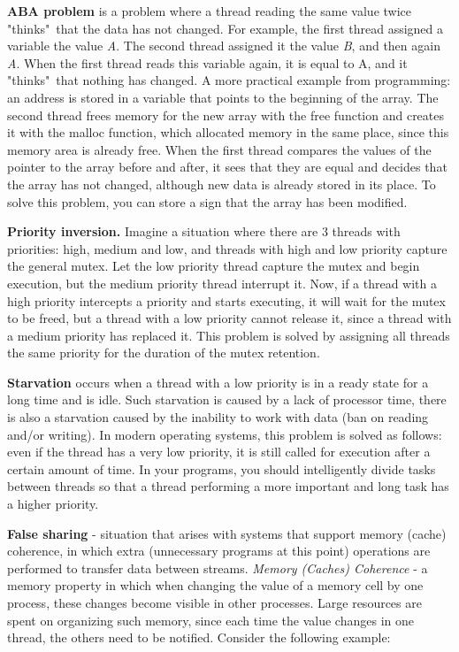 {	\par\textbf{ABA problem} is a problem where a thread reading the same value twice "thinks"\ that the data has not changed. For example, the first thread assigned a variable the value \textit{A}. The second thread assigned it the value \textit{B}, and then again \textit{A}. When the first thread reads this variable again, it is equal to A, and it "thinks"\ that nothing has changed. A more practical example from programming: an address is stored in a variable that points to the beginning of the array. The second thread frees memory for the new array with the free function and creates it with the malloc function, which allocated memory in the same place, since this memory area is already free. When the first thread compares the values of the pointer to the array before and after, it sees that they are equal and decides that the array has not changed, although new data is already stored in its place. To solve this problem, you can store a sign that the array has been modified.
	\par\textbf{Priority inversion.} Imagine a situation where there are 3 threads with priorities: high, medium and low, and threads with high and low priority capture the general mutex. Let the low priority thread capture the mutex and begin execution, but the medium priority thread interrupt it. Now, if a thread with a high priority intercepts a priority and starts executing, it will wait for the mutex to be freed, but a thread with a low priority cannot release it, since a thread with a medium priority has replaced it. This problem is solved by assigning all threads the same priority for the duration of the mutex retention.
	\par\textbf{Starvation} occurs when a thread with a low priority is in a ready state for a long time and is idle. Such starvation is caused by a lack of processor time, there is also a starvation caused by the inability to work with data (ban on reading and/or writing). In modern operating systems, this problem is solved as follows: even if the thread has a very low priority, it is still called for execution after a certain amount of time. In your programs, you should intelligently divide tasks between threads so that a thread performing a more important and long task has a higher priority.
	\par\textbf{False sharing} -  situation that arises with systems that support memory (cache) coherence, in which extra (unnecessary programs at this point) operations are performed to transfer data between streams. \textit{Memory (Caches) Coherence} - a memory property in which when changing the value of a memory cell by one process, these changes become visible in other processes. Large resources are spent on organizing such memory, since each time the value changes in one thread, the others need to be notified. Consider the following example:
}
